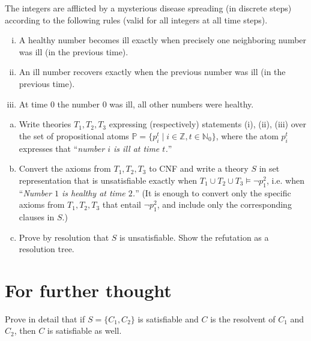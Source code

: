 \begin{problem}

    The integers are afflicted by a mysterious disease spreading (in discrete steps) according to the following rules (valid for all integers at all time steps).
    \begin{enumerate}[(i)]\it
        \item A healthy number becomes ill exactly when precisely one neighboring number was ill (in the previous time).
        \item An ill number recovers exactly when the previous number was ill (in the previous time).
        \item At time $0$ the number $0$ was ill, all other numbers were healthy.
    \end{enumerate}
    \begin{enumerate}[(a)]
        \item Write theories $T_1, T_2, T_3$ expressing (respectively) statements (i), (ii), (iii) over the set of propositional atoms $\mathbb{P}=\{p_i^t \mid i\in\mathbb{Z}, t\in\mathbb{N}_0\}$, where the atom $p_i^t$ expresses that ``{\it number $i$ is ill at time $t$.}'' 
        \item Convert the axioms from $T_1, T_2, T_3$ to CNF and write a theory $S$ in set representation that is unsatisfiable exactly when $T_1 \cup T_2 \cup T_3 \models \neg p_1^2$, i.e. when ``{\it Number $1$ is healthy at time $2$.}'' (It is enough to convert only the specific axioms from $T_1,T_2,T_3$ that entail $\neg p_1^2$, and include only the corresponding clauses in $S$.)
        \item Prove by resolution that $S$ is unsatisfiable. Show the refutation as a resolution tree.
    \end{enumerate}

\end{problem}


        
\section*{For further thought}


\begin{problem}
    Prove in detail that if $S=\{C_1,C_2\}$ is satisfiable and $C$ is the resolvent of $C_1$ and $C_2$, then $C$ is satisfiable as well.
\end{problem}

